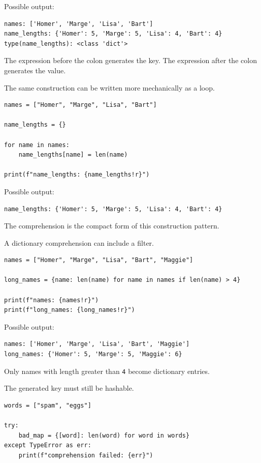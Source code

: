 Possible output:

\begin{verbatim}
names: ['Homer', 'Marge', 'Lisa', 'Bart']
name_lengths: {'Homer': 5, 'Marge': 5, 'Lisa': 4, 'Bart': 4}
type(name_lengths): <class 'dict'>
\end{verbatim}

The expression before the colon generates the key. The expression after the colon generates the value.

The same construction can be written more mechanically as a loop.

\begin{verbatim}
names = ["Homer", "Marge", "Lisa", "Bart"]

name_lengths = {}

for name in names:
    name_lengths[name] = len(name)

print(f"name_lengths: {name_lengths!r}")
\end{verbatim}

Possible output:

\begin{verbatim}
name_lengths: {'Homer': 5, 'Marge': 5, 'Lisa': 4, 'Bart': 4}
\end{verbatim}

The comprehension is the compact form of this construction pattern.

A dictionary comprehension can include a filter.

\begin{verbatim}
names = ["Homer", "Marge", "Lisa", "Bart", "Maggie"]

long_names = {name: len(name) for name in names if len(name) > 4}

print(f"names: {names!r}")
print(f"long_names: {long_names!r}")
\end{verbatim}

Possible output:

\begin{verbatim}
names: ['Homer', 'Marge', 'Lisa', 'Bart', 'Maggie']
long_names: {'Homer': 5, 'Marge': 5, 'Maggie': 6}
\end{verbatim}

Only names with length greater than \texttt{4} become dictionary entries.

The generated key must still be hashable.

\begin{verbatim}
words = ["spam", "eggs"]

try:
    bad_map = {[word]: len(word) for word in words}
except TypeError as err:
    print(f"comprehension failed: {err}")
\end{verbatim}

